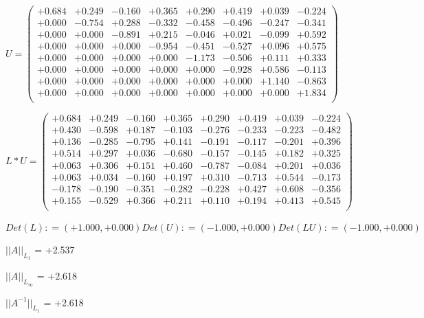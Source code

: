 \documentclass[9pt]{article}
\theoremstyle{plain}
\theoremstyle{definition}
\theoremstyle{remark}
\numberwithin{equation}{section}
\begin{document}
$U = \left(
\begin{array}{
cccccccc}
+0.684 & +0.249 & -0.160 & +0.365 & +0.290 & +0.419 & +0.039 & -0.224 \\
+0.000 & -0.754 & +0.288 & -0.332 & -0.458 & -0.496 & -0.247 & -0.341 \\
+0.000 & +0.000 & -0.891 & +0.215 & -0.046 & +0.021 & -0.099 & +0.592 \\
+0.000 & +0.000 & +0.000 & -0.954 & -0.451 & -0.527 & +0.096 & +0.575 \\
+0.000 & +0.000 & +0.000 & +0.000 & -1.173 & -0.506 & +0.111 & +0.333 \\
+0.000 & +0.000 & +0.000 & +0.000 & +0.000 & -0.928 & +0.586 & -0.113 \\
+0.000 & +0.000 & +0.000 & +0.000 & +0.000 & +0.000 & +1.140 & -0.863 \\
+0.000 & +0.000 & +0.000 & +0.000 & +0.000 & +0.000 & +0.000 & +1.834 \\
\end{array}
\right)$ \newline 

$L * U  = \left(
\begin{array}{
cccccccc}
+0.684 & +0.249 & -0.160 & +0.365 & +0.290 & +0.419 & +0.039 & -0.224 \\
+0.430 & -0.598 & +0.187 & -0.103 & -0.276 & -0.233 & -0.223 & -0.482 \\
+0.136 & -0.285 & -0.795 & +0.141 & -0.191 & -0.117 & -0.201 & +0.396 \\
+0.514 & +0.297 & +0.036 & -0.680 & -0.157 & -0.145 & +0.182 & +0.325 \\
+0.063 & +0.306 & +0.151 & +0.460 & -0.787 & -0.084 & +0.201 & +0.036 \\
+0.063 & +0.034 & -0.160 & +0.197 & +0.310 & -0.713 & +0.544 & -0.173 \\
-0.178 & -0.190 & -0.351 & -0.282 & -0.228 & +0.427 & +0.608 & -0.356 \\
+0.155 & -0.529 & +0.366 & +0.211 & +0.110 & +0.194 & +0.413 & +0.545 \\
\end{array}
\right)$ \newline 

$Det(L) :    = (+1.000,+0.000)     Det(U) :    = (-1.000,+0.000)     Det(LU) :    = (-1.000,+0.000)$

$||A||_{L_1}$  = +2.537

$||A||_{L_{\infty}}$ = +2.618

$||A^{-1}||_{L_1}$  = +2.618
\end{document}
